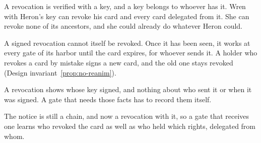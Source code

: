 \begin{pdboundary}
\setlength{\parskip}{4pt plus 1pt}
A revocation is verified with a key, and a key belongs to whoever has it.
Wren with Heron's key can revoke his card and every card delegated from it.
She can revoke none of its ancestors, and she could already do whatever
Heron could.

A signed revocation cannot itself be revoked. Once it has been seen, it
works at every gate of its harbor until the card expires, for whoever sends
it. A holder who revokes a card by mistake signs a new card, and the old one
stays revoked (Design invariant~\ref{prop:no-reanim}).

A revocation shows whose key signed, and nothing about who sent it or when
it was signed. A gate that needs those facts has to record them itself.

The notice is still a chain, and now a revocation with it, so a gate that
receives one learns who revoked the card as well as who held which rights,
delegated from whom.
\end{pdboundary}
